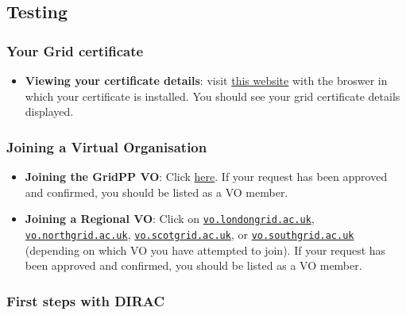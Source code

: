 \subsection{Testing}
\label{getting-on-the-grid---testing}

\subsubsection{Your Grid certificate}
\label{your-grid-certificate-testing}

\begin{itemize}
\tightlist
\item
  \textbf{Viewing your certificate details}: visit
  \href{https://portal.ca.grid-support.ac.uk/caportal/cert_owner}{this
  website} with the broswer in which your certificate is installed. You
  should see your grid certificate details displayed.
\end{itemize}

\subsubsection{Joining a Virtual Organisation}
\label{joining-a-virtual-organisation-testing}

\begin{itemize}
\tightlist
\item
  \textbf{Joining the GridPP VO}: Click
  \href{https://voms.gridpp.ac.uk:8443/voms/gridpp/user/search.action}{here}.
  If your request has been approved and confirmed, you should be listed
  as a VO member.
\item
  \textbf{Joining a Regional VO}: Click on
  \href{https://voms.gridpp.ac.uk:8443/voms/vo.londongrid.ac.uk/user/search.action}{\texttt{vo.londongrid.ac.uk}},
  \href{https://voms.gridpp.ac.uk:8443/voms/vo.northgrid.ac.uk/user/search.action}{\texttt{vo.northgrid.ac.uk}},
  \href{https://voms.gridpp.ac.uk:8443/voms/vo.scotgrid.ac.uk/user/search.action}{\texttt{vo.scotgrid.ac.uk}},
  or
  \href{https://voms.gridpp.ac.uk:8443/voms/vo.southgrid.ac.uk/user/search.action}{\texttt{vo.southgrid.ac.uk}}
  (depending on which VO you have attempted to join). If your request
  has been approved and confirmed, you should be listed as a VO member.
\end{itemize}

\subsubsection{First steps with DIRAC}
\label{first-steps-with-dirac-testing}

